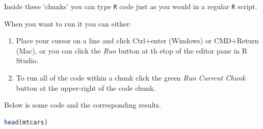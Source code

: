 \documentclass[
]{book}
\newcommand{\passthrough}[1]{#1}
\providecommand{\tightlist}{%
  \setlength{\itemsep}{0pt}\setlength{\parskip}{0pt}}
\begin{document}
Inside these `chunks' you can type \passthrough{\lstinline!R!} code just as you would in a regular \passthrough{\lstinline!R!} script.

When you want to run it you can either:

\begin{enumerate}
\def\labelenumi{\arabic{enumi}.}
\tightlist
\item
  Place your cursor on a line and click Ctrl+enter (Windows) or CMD+Return (Mac), or you can click the \emph{Run} button at th etop of the editor pane in R Studio.
\item
  To run all of the code within a chunk click the green \emph{Run Current Chunk} button at the upper-right of the code chunk.
\end{enumerate}

Below is some code and the corresponding results.

\begin{lstlisting}[language=R]
head(mtcars)
\end{lstlisting}

 
  \providecommand{\huxb}[2]{\arrayrulecolor[RGB]{#1}\global\arrayrulewidth=#2pt}
  \providecommand{\huxvb}[2]{\color[RGB]{#1}\vrule width #2pt}
  \providecommand{\huxtpad}[1]{\rule{0pt}{#1}}
  \providecommand{\huxbpad}[1]{\rule[-#1]{0pt}{#1}}
\end{document}
